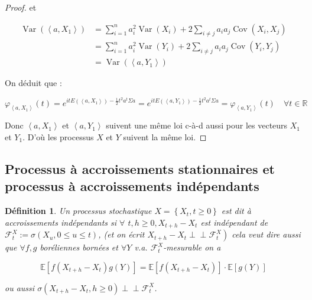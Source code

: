 \documentclass[A4paper,12pt]{report}
\def\Perp{\perp\!\!\!\perp}
\newtheorem{definition}{D\'efinition}[chapter]
\newcommand{\E}{{\mathbb{E}}}
\begin{document}
\begin{proof}
et

$$
\begin{aligned}
\operatorname{Var}\left(\left\langle a, X_{1}\right\rangle\right) & =\sum_{i=1}^{n} a_{i}^{2} \operatorname{Var}\left(X_{i}\right)+2 \sum_{i \neq j} a_{i} a_{j} \operatorname{Cov}\left(X_{i}, X_{j}\right) \\
& =\sum_{i=1}^{n} a_{i}^{2} \operatorname{Var}\left(Y_{i}\right)+2 \sum_{i \neq j} a_{i} a_{j} \operatorname{Cov}\left(Y_{i}, Y_{j}\right) \\
& =\operatorname{Var}\left(\left\langle a, Y_{1}\right\rangle\right)
\end{aligned}
$$

On déduit que :

$$
\varphi_{\left\langle a, X_{1}\right\rangle}(t)=e^{i t E\left(\left\langle a, X_{1}\right\rangle\right)-\frac{1}{2} t^{2} a^{t} \Sigma a}=e^{i t E\left(\left\langle a, Y_{1}\right\rangle\right)-\frac{1}{2} t^{2} a^{t} \Sigma a}=\varphi_{\left\langle a, Y_{1}\right\rangle}(t) \quad \forall t \in \mathbb{R}
$$

Donc $\left\langle a, X_{1}\right\rangle$ et $\left\langle a, Y_{1}\right\rangle$ suivent une même loi c-à-d aussi pour les vecteurs $X_{1}$ et $Y_{1}$. D'où les processus $X$ et $Y$ suivent la même loi.
\end{proof} 
\subsection{Processus à accroissements  stationnaires et processus à accroissements indépendants}

\begin{definition} 
Un processus stochastique $X=\left\{X_{t}, t \geq 0\right\}$ est dit à accroissements indépendants si $\forall$ $t, h \geq 0, X_{t+h}-X_{t}$ est indépendant de $\mathcal{F}_{t}^{X}:=\sigma\left(X_{u}, 0 \leq u \leq t\right)$, (et on écrit $\left.X_{t+h}-X_{t} \Perp \mathcal{F}_{t}^{X}\right)$ cela veut dire aussi que $\forall f, g$ boréliennes bornées et $\forall Y$ v.a. $\mathcal{F}_{t}^{X}$-mesurable on a

$$
\E\left[f\left(X_{t+h}-X_{t}\right) g(Y)\right]= \E\left[f\left(X_{t+h}-X_{t}\right)\right] \cdot \E[g(Y)]
$$

ou aussi $\sigma\left(X_{t+h}-X_{t}, h \geq 0\right) \Perp \mathcal{F}_{t}^{X}$.
\end{definition} 
\end{document}
